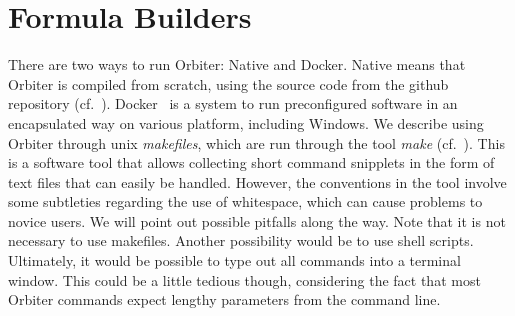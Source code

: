 



\clearpage

\section{Formula Builders}
\label{sec:formula:builder}





\clearpage




%



There are two ways to run Orbiter: Native and Docker.
Native means that Orbiter is compiled from scratch, 
using the source code from the github repository (cf.~\cite{Orbiter}).
Docker~\cite{docker} is a system to run preconfigured software in an encapsulated way on various platform, 
including Windows.
We describe using Orbiter through unix {\em makefiles}, 
which are run through the tool {\em make} (cf.~\cite{make}). 
This is a software tool that allows collecting short command snipplets in 
the form of text files that can easily be handled. 
However, the conventions in the tool involve some subtleties regarding the use of whitespace, 
which can cause problems to novice users. 
We will point out possible pitfalls along the way. 
Note that it is not necessary to use makefiles. 
Another possibility would be to use shell scripts. 
Ultimately, it would be possible to type out all commands into a terminal window. 
This could be a little tedious though, considering the fact that 
most Orbiter commands expect lengthy parameters from the command line.

 
\smallskip

